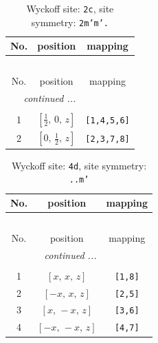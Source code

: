 \documentclass[fleqn,8pt]{jsarticle}
\begin{document}
\begin{longtable}{ccc}
\caption{Wyckoff site: {\tt 2c}, site symmetry: {\tt 2m'm'.}}
 \\
 \hline \hline
No. & position & mapping \\ \hline \endfirsthead

\multicolumn{2}{l}{\tablename\ \thetable{}} \\
 \hline \hline
No. & position & mapping \\ \hline \endhead

 \hline \hline
\multicolumn{2}{r}{\footnotesize\it continued ...} \\ \endfoot

 \hline \hline
\multicolumn{2}{r}{} \\ \endlastfoot

1 & $\left[ \frac{1}{2},\, 0,\, z \right]$ & {\tt [1,4,5,6]} \\ \hline
2 & $\left[ 0,\, \frac{1}{2},\, z \right]$ & {\tt [2,3,7,8]} \\
\end{longtable}
\renewcommand{\arraystretch}{1.2}
\begin{longtable}{ccc}
\caption{Wyckoff site: {\tt 4d}, site symmetry: {\tt ..m'}}
 \\
 \hline \hline
No. & position & mapping \\ \hline \endfirsthead

\multicolumn{2}{l}{\tablename\ \thetable{}} \\
 \hline \hline
No. & position & mapping \\ \hline \endhead

 \hline \hline
\multicolumn{2}{r}{\footnotesize\it continued ...} \\ \endfoot

 \hline \hline
\multicolumn{2}{r}{} \\ \endlastfoot

1 & $\left[ x,\, x,\, z \right]$ & {\tt [1,8]} \\ \hline
2 & $\left[ - x,\, x,\, z \right]$ & {\tt [2,5]} \\ \hline
3 & $\left[ x,\, - x,\, z \right]$ & {\tt [3,6]} \\ \hline
4 & $\left[ - x,\, - x,\, z \right]$ & {\tt [4,7]} \\
\end{longtable}
\renewcommand{\arraystretch}{1.2}
\end{document}
